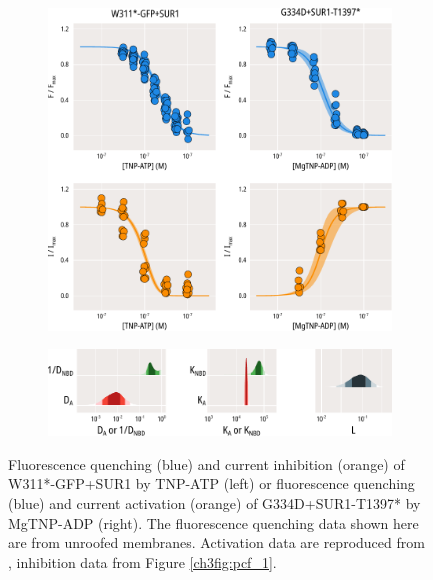 \begin{figure}[hbtp]
	\centering
	\begin{subfigure}[t]{0.9\textwidth}
		\caption{}\label{ch7fig:activation_fit_1}
		\centering
		\includegraphics[width=\textwidth]{activation_fit_1.pdf}
	\end{subfigure}
	\vfill
	\begin{subfigure}[t]{0.9\textwidth}
		\caption{}\label{ch7fig:activation_params_1}
		\centering
		\includegraphics[width=\textwidth]{activation_params_1.pdf}
	\end{subfigure}
	\caption[TNP-ATP inhibits K\ATP{} channels more strongly than MgTNP-ADP activates them]{
	{\bf{}}
	 Fluorescence quenching (blue) and current inhibition (orange) of W311*-GFP+SUR1 by TNP-ATP (left) or fluorescence quenching (blue) and current activation (orange) of G334D+SUR1-T1397* by MgTNP-ADP (right).
	The fluorescence quenching data shown here are from unroofed membranes.
	Activation data are reproduced from \textcite{puljung_activation_2019-1}, inhibition data from Figure \ref{ch3fig:pcf_1}.
}
\end{figure}
